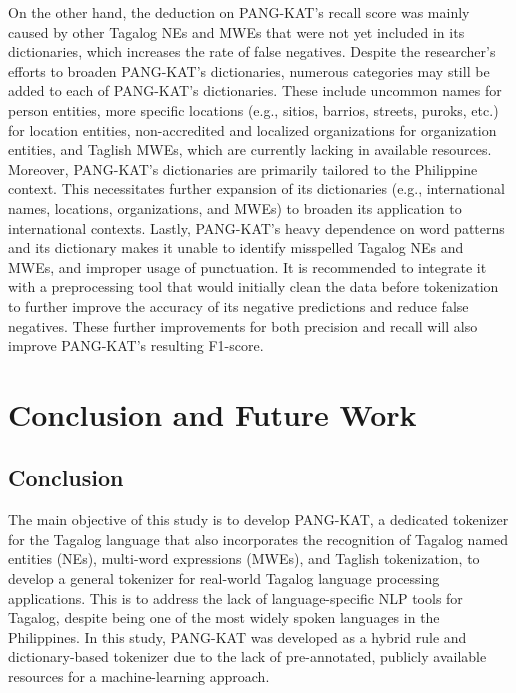 \documentclass[journal]{./IEEE/IEEEtran}
\begin{document}
On the other hand, the deduction on PANG-KAT’s recall score was mainly caused by other Tagalog NEs and MWEs that were not yet included in its dictionaries, which increases the rate of false negatives. Despite the researcher's efforts to broaden PANG-KAT’s dictionaries, numerous categories may still be added to each of PANG-KAT’s dictionaries. These include uncommon names for person entities, more specific locations (e.g., sitios, barrios, streets, puroks, etc.) for location entities, non-accredited and localized organizations for organization entities, and Taglish MWEs, which are currently lacking in available resources. \\

Moreover, PANG-KAT's dictionaries are primarily tailored to the Philippine context. This necessitates further expansion of its dictionaries (e.g., international names, locations, organizations, and MWEs) to broaden its application to international contexts. Lastly, PANG-KAT's heavy dependence on word patterns and its dictionary makes it unable to identify misspelled Tagalog NEs and MWEs, and improper usage of punctuation. It is recommended to integrate it with a preprocessing tool that would initially clean the data before tokenization to further improve the accuracy of its negative predictions and reduce false negatives. These further improvements for both precision and recall will also improve PANG-KAT’s resulting F1-score. \\

\section{Conclusion and Future Work}
\subsection {Conclusion}

The main objective of this study is to develop PANG-KAT, a dedicated tokenizer for the Tagalog language that also incorporates the recognition of Tagalog named entities (NEs), multi-word expressions (MWEs), and Taglish tokenization, to develop a general tokenizer for real-world Tagalog language processing applications. This is to address the lack of language-specific NLP tools for Tagalog, despite being one of the most widely spoken languages in the Philippines. In this study, PANG-KAT was developed as a hybrid rule and dictionary-based tokenizer due to the lack of pre-annotated, publicly available resources for a machine-learning approach. \\
\end{document}
